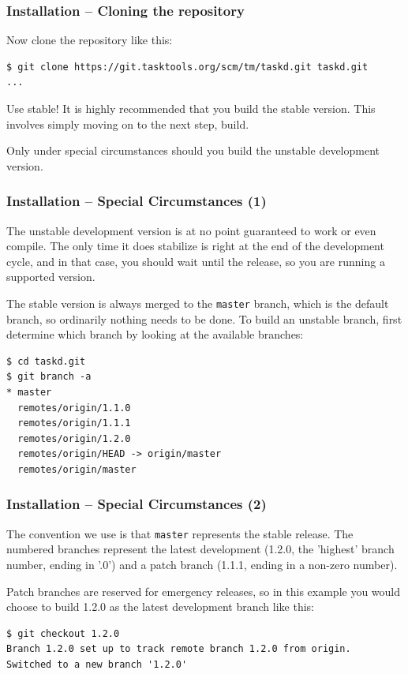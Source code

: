 \documentclass[t,handout]{beamer}
\begin{document}
\begin{frame}[fragile]\frametitle{Installation -- Cloning the repository}
    Now clone the repository like this:

    \begin{lstlisting}
$ git clone https://git.tasktools.org/scm/tm/taskd.git taskd.git
...\end{lstlisting}

    \vfill
    \begin{alertblock}{Use stable!}
        It is highly recommended that you build the stable version. This involves simply moving on to the next step, build.

        Only under special circumstances should you build the unstable development version.
    \end{alertblock}
\end{frame}

\begin{frame}[fragile]\frametitle{Installation -- Special Circumstances (1)}
    The unstable development version is at no point guaranteed to work or even compile. The only time it does stabilize is right at the end of the development cycle, and in that case, you should wait until the release, so you are running a supported version.

    The stable version is always merged to the \verb+master+ branch, which is the default branch, so ordinarily nothing needs to be done. To build an unstable branch, first determine which branch by looking at the available branches:

    \begin{lstlisting}
$ cd taskd.git
$ git branch -a
* master
  remotes/origin/1.1.0
  remotes/origin/1.1.1
  remotes/origin/1.2.0
  remotes/origin/HEAD -> origin/master
  remotes/origin/master\end{lstlisting}
\end{frame}

\begin{frame}[fragile]\frametitle{Installation -- Special Circumstances (2)}
    The convention we use is that \verb+master+ represents the stable release.  The numbered branches represent the latest development (1.2.0, the 'highest' branch number, ending in '.0') and a patch branch (1.1.1, ending in a non-zero number).

    Patch branches are reserved for emergency releases, so in this example you would choose to build 1.2.0 as the latest development branch like this:

    \begin{lstlisting}
$ git checkout 1.2.0
Branch 1.2.0 set up to track remote branch 1.2.0 from origin.
Switched to a new branch '1.2.0'\end{lstlisting}
\end{frame}
\end{document}
